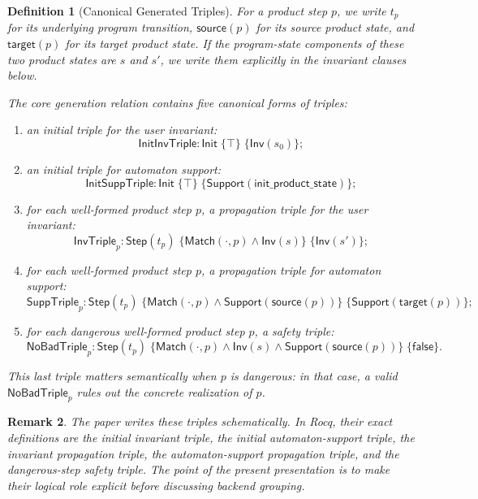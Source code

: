 \documentclass[11pt,a4paper]{article}
\newtheorem{definition}{Definition}[section]
\newtheorem{remark}[definition]{Remark}
\newcommand{\False}{\mathsf{false}}
\newcommand{\UserInv}{\mathsf{Inv}}
\newcommand{\Support}{\mathsf{Support}}
\newcommand{\Match}{\mathsf{Match}}
\begin{document}
\begin{definition}[Canonical Generated Triples]
For a product step \(p\), we write \(t_p\) for its underlying program
transition, \(\mathsf{source}(p)\) for its source product state, and
\(\mathsf{target}(p)\) for its target product state.
If the program-state components of these two product states are \(s\) and
\(s'\), we write them explicitly in the invariant clauses below.

The core generation relation contains five canonical forms of triples:
\begin{enumerate}[leftmargin=1.4em]
\item an initial triple for the user invariant:
  \[
  \mathsf{InitInvTriple} :
  \mathsf{Init} \;\{ \top \}\; \{ \UserInv(s_0) \};
  \]
\item an initial triple for automaton support:
  \[
  \mathsf{InitSuppTriple} :
  \mathsf{Init} \;\{ \top \}\; \{ \Support(\mathsf{init\_product\_state}) \};
  \]
\item for each well-formed product step \(p\), a propagation triple for the
  user invariant:
  \[
  \mathsf{InvTriple}_p :
  \mathsf{Step}(t_p)\;
  \{ \Match(\cdot,p) \land \UserInv(s) \}\;
  \{ \UserInv(s') \};
  \]
\item for each well-formed product step \(p\), a propagation triple for
  automaton support:
  \[
  \mathsf{SuppTriple}_p :
  \mathsf{Step}(t_p)\;
  \{ \Match(\cdot,p) \land \Support(\mathsf{source}(p)) \}\;
  \{ \Support(\mathsf{target}(p)) \};
  \]
\item for each dangerous well-formed product step \(p\), a safety triple:
  \[
  \mathsf{NoBadTriple}_p :
  \mathsf{Step}(t_p)\;
  \{ \Match(\cdot,p) \land \UserInv(s) \land \Support(\mathsf{source}(p)) \}\;
  \{ \False \}.
  \]
\end{enumerate}
\noindent
This last triple matters semantically when \(p\) is dangerous: in that case, a
valid \(\mathsf{NoBadTriple}_p\) rules out the concrete realization of \(p\).
\end{definition}

\begin{remark}
The paper writes these triples schematically. In Rocq, their exact definitions
are the initial invariant triple, the initial automaton-support triple, the
invariant propagation triple, the automaton-support propagation triple, and
the dangerous-step safety triple. The point of the present presentation is to
make their logical role explicit before discussing backend grouping.
\end{remark}
\end{document}
